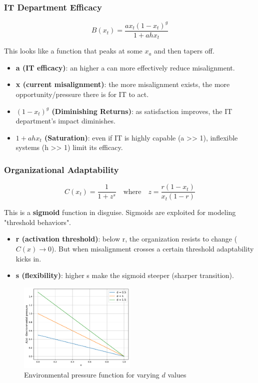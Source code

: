 \documentclass[a4paper, 10pt]{article}
\begin{document}
\subsubsection{IT Department Efficacy}
\begin{equation}
	B(x_t) = \frac{a x_t (1 - x_t)^g}{1 + a h x_t}
\end{equation}

This looks like a function that peaks at some $x_a$ and then tapers off.

\begin{itemize}
	\item \textbf{a (IT efficacy)}: an higher a can more effectively reduce misalignment.
	\item \textbf{x (current misalignment)}: the more misalignment exists, the more opportunity/pressure there is for IT to act.
	\item \textbf{$(1 - x_t)^g$ (Diminishing Returns)}: as satisfaction improves, the IT department's impact diminishes.
	\item \textbf{$1 + ahx_t$ (Saturation)}: even if IT is highly capable (a >> 1), inflexible systems (h >> 1) limit its efficacy.
\end{itemize}



\subsubsection{Organizational Adaptability}
\begin{equation}
	C(x_t) = \frac{1}{1 + z^s} \quad \text{where} \quad z = \frac{r (1 - x_t)}{x_t (1 - r)}
\end{equation}

This is a \textbf{sigmoid} function in disguise. Sigmoids are exploited for modeling "threshold behaviors".

\begin{itemize}
	\item \textbf{r (activation threshold)}: below r, the organization resists to change ($C(x) \rightarrow 0$). But when misalignment crosses a certain threshold adaptability kicks in.
	\item \textbf{s (flexibility)}: higher s make the sigmoid steeper (sharper transition).
\end{itemize}

\begin{figure}[h]
	\centering
	\includegraphics[width=0.5\textwidth]{../images/params/A(x).pdf}
	\caption{Environmental pressure function for varying $d$ values}
\end{figure}
\end{document}
